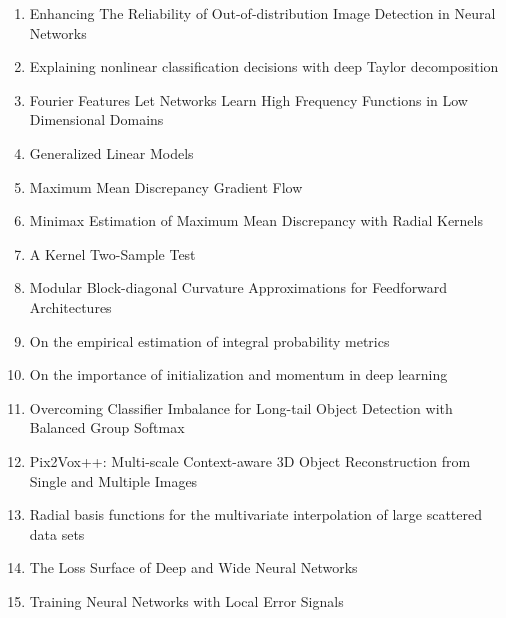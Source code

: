\documentclass[acmlarge]{acmart}
\begin{document}
\begin{enumerate}
	\item Enhancing The Reliability of Out-of-distribution Image Detection in Neural Networks \cite{Liang2018EnhancingTR} 

	\item Explaining nonlinear classification decisions with deep Taylor decomposition \cite{Montavon2017ExplainingNC} 

	\item Fourier Features Let Networks Learn High Frequency Functions in Low Dimensional Domains \cite{Tancik2020FourierFL} 

	\item Generalized Linear Models \cite{McCullagh1972GeneralizedLM} 

	\item Maximum Mean Discrepancy Gradient Flow \cite{Arbel2019MaximumMD} 

	\item Minimax Estimation of Maximum Mean Discrepancy with Radial Kernels \cite{Tolstikhin2016MinimaxEO} 

	\item A Kernel Two-Sample Test \cite{Gretton2012AKT} 

	\item Modular Block-diagonal Curvature Approximations for Feedforward Architectures \cite{Dangel2020ModularBC} 

	\item On the empirical estimation of integral probability metrics \cite{Sriperumbudur2012OnTE} 

	\item On the importance of initialization and momentum in deep learning \cite{Sutskever2013OnTI} 

	\item Overcoming Classifier Imbalance for Long-tail Object Detection with Balanced Group Softmax \cite{Li2020OvercomingCI} 

	\item Pix2Vox++: Multi-scale Context-aware 3D Object Reconstruction from Single and Multiple Images \cite{Xie2020Pix2VoxMC} 

	\item Radial basis functions for the multivariate interpolation of large scattered data sets \cite{Lazzaro2002RadialBF} 

	\item The Loss Surface of Deep and Wide Neural Networks \cite{Nguyen2017TheLS} 

	\item Training Neural Networks with Local Error Signals \cite{Nkland2019TrainingNN} 


\end{enumerate}
\end{document}
